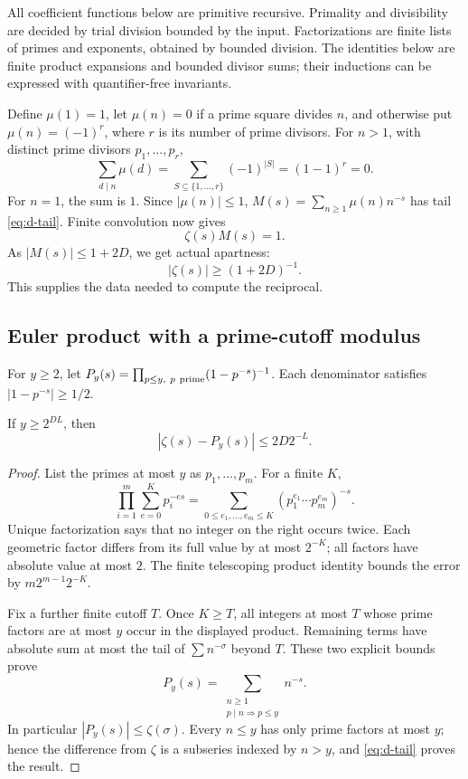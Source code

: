 All coefficient functions below are primitive recursive. Primality and
divisibility are decided by trial division bounded by the input.
Factorizations are finite lists of primes and exponents, obtained by
bounded division. The identities below are finite product expansions
and bounded divisor sums; their inductions can be expressed with
quantifier-free invariants.

Define \(\mu(1)=1\), let \(\mu(n)=0\) if a prime square divides \(n\),
and otherwise put \(\mu(n)=(-1)^r\), where \(r\) is its number of prime
divisors. For \(n>1\), with distinct prime divisors \(p_1,\ldots,p_r\),
\[
 \sum_{d\mid n}\mu(d)
   =\sum_{S\subseteq\{1,\ldots,r\}}(-1)^{|S|}
   =(1-1)^r=0.                                       \tag{D6}\label{eq:d-mu}
\]
For \(n=1\), the sum is \(1\). Since \(|\mu(n)|\leq1\),
\(M(s)=\sum_{n\geq1}\mu(n)n^{-s}\) has tail \eqref{eq:d-tail}.
Finite convolution now gives
\[
                         \zeta(s)M(s)=1.              \tag{D7}\label{eq:d-reciprocal}
\]
As \(|M(s)|\leq1+2D\), we get actual apartness:
\[
                \boxed{|\zeta(s)|\geq(1+2D)^{-1}.}    \tag{D8}\label{eq:d-nonzero}
\]
This supplies the data needed to compute the reciprocal.

\subsection{Euler product with a prime-cutoff modulus}

For \(y\geq2\), let
\(P_y(s)=\prod_{p\leq y,\ p\ {\rm prime}}(1-p^{-s})^{-1}\).
Each denominator satisfies \(|1-p^{-s}|\geq1/2\).

\begin{theorem}\label{thm:d-euler-product}
If \(y\geq2^{DL}\), then
\[
                         |\zeta(s)-P_y(s)|\leq2D2^{-L}.
                                                               \tag{D9}\label{eq:d-product-tail}
\]
\end{theorem}
\begin{proof}
List the primes at most \(y\) as \(p_1,\ldots,p_m\). For a finite \(K\),
\[
 \prod_{i=1}^m\sum_{e=0}^Kp_i^{-es}
 =\sum_{0\leq e_1,\ldots,e_m\leq K}
                    (p_1^{e_1}\cdots p_m^{e_m})^{-s}.
\]
Unique factorization says that no integer on the right occurs twice.
Each geometric factor differs from its full value by at most \(2^{-K}\);
all factors have absolute value at most \(2\).
The finite telescoping product identity bounds the error by
\(m2^{m-1}2^{-K}\).

Fix a further finite cutoff \(T\). Once \(K\geq T\), all integers at most
\(T\) whose prime factors are at most \(y\) occur in the displayed
product. Remaining terms have absolute sum at most the tail of
\(\sum n^{-\sigma}\) beyond \(T\).
These two explicit bounds prove
\[
 P_y(s)=\sum_{\substack{n\geq1\\p\mid n\Rightarrow p\leq y}}n^{-s}.
\]
In particular \(|P_y(s)|\leq\zeta(\sigma)\).
Every \(n\leq y\) has only prime factors at most \(y\); hence the
difference from \(\zeta\) is a subseries indexed by \(n>y\), and
\eqref{eq:d-tail} proves the result.
\end{proof}


